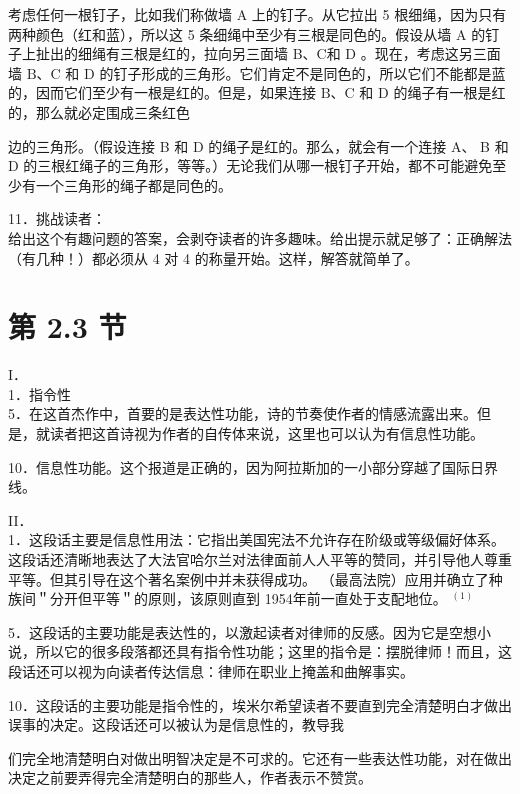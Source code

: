 考虑任何一根钉子，比如我们称做墙 A 上的钉子。从它拉出 5 根细绳，因为只有两种颜色（红和蓝），所以这 5 条细绳中至少有三根是同色的。假设从墙 A 的钉子上扯出的细绳有三根是红的，拉向另三面墙 B、C和 D 。现在，考虑这另三面墙 $\mathrm{B} 、 \mathrm{C}$ 和 D 的钉子形成的三角形。它们肯定不是同色的，所以它们不能都是蓝的，因而它们至少有一根是红的。但是，如果连接 $\mathrm{B} 、 \mathrm{C}$ 和 D 的绳子有一根是红的，那么就必定围成三条红色

边的三角形。（假设连接 B 和 D 的绳子是红的。那么，就会有一个连接 A、 B 和 D 的三根红绳子的三角形，等等。）无论我们从哪一根钉子开始，都不可能避免至少有一个三角形的绳子都是同色的。

11．挑战读者：\\
给出这个有趣问题的答案，会剥夺读者的许多趣味。给出提示就足够了：正确解法（有几种！）都必须从 4 对 4 的称量开始。这样，解答就简单了。

\section*{第 2.3 节}
I．\\
1．指令性\\
5．在这首杰作中，首要的是表达性功能，诗的节奏使作者的情感流露出来。但是，就读者把这首诗视为作者的自传体来说，这里也可以认为有信息性功能。

10．信息性功能。这个报道是正确的，因为阿拉斯加的一小部分穿越了国际日界线。

II．\\
1．这段话主要是信息性用法：它指出美国宪法不允许存在阶级或等级偏好体系。这段话还清晰地表达了大法官哈尔兰对法律面前人人平等的赞同，并引导他人尊重平等。但其引导在这个著名案例中并未获得成功。 （最高法院）应用并确立了种族间＂分开但平等＂的原则，该原则直到 1954年前一直处于支配地位。 ${ }^{(1)}$

5．这段话的主要功能是表达性的，以激起读者对律师的反感。因为它是空想小说，所以它的很多段落都还具有指令性功能；这里的指令是：摆脱律师！而且，这段话还可以视为向读者传达信息：律师在职业上掩盖和曲解事实。

10．这段话的主要功能是指令性的，埃米尔希望读者不要直到完全清楚明白才做出误事的决定。这段话还可以被认为是信息性的，教导我

们完全地清楚明白对做出明智决定是不可求的。它还有一些表达性功能，对在做出决定之前要弄得完全清楚明白的那些人，作者表示不赞赏。

